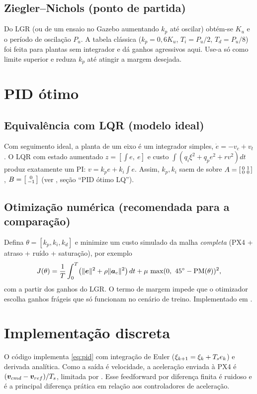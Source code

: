 \subsection{Ziegler--Nichols (ponto de partida)}
Do LGR (ou de um ensaio no Gazebo aumentando $k_p$ até oscilar) obtém-se $K_u$ e o
período de oscilação $P_u$. A tabela clássica ($k_p=0{,}6K_u$, $T_i=P_u/2$,
$T_d=P_u/8$) foi feita para plantas sem integrador e dá ganhos agressivos aqui. Use-a
só como limite superior e reduza $k_p$ até atingir a margem desejada.

\section{PID ótimo}
\subsection{Equivalência com LQR (modelo ideal)}
Com seguimento ideal, a planta de um eixo é um integrador simples, $\dot e = -v_c + v_t$.
O LQR com estado aumentado $z=[\int e,\ e]$ e custo
$\int(q_i\xi^2 + q_p e^2 + r v^2)dt$ produz exatamente um PI:
$v = k_p e + k_i\int e$. Assim, $k_p,k_i$ saem de  sobre
$A=\begin{bsmallmatrix}0&1\\0&0\end{bsmallmatrix}$, $B=\begin{bsmallmatrix}0\\-1\end{bsmallmatrix}$
(ver , seção ``PID ótimo LQ'').

\subsection{Otimização numérica (recomendada para a comparação)}
Defina $\theta=[k_p,k_i,k_d]$ e minimize um custo simulado da malha \emph{completa}
(PX4 + atraso + ruído + saturação), por exemplo
\begin{equation}
  J(\theta) = \frac1{T}\int_0^T\!\left(\lVert\bm{e}\rVert^2 + \rho\lVert\bm{a}_c\rVert^2\right)dt
  + \mu\,\max(0,\ \ang{45}-\text{PM}(\theta))^2 ,
\end{equation}
com  a partir dos ganhos do LGR. O termo de margem impede que o
otimizador escolha ganhos frágeis que só funcionam no cenário de treino.
Implementado em .

\section{Implementação discreta}
O código implementa \eqref{eq:pid} com integração de Euler
($\xi_{k+1}=\xi_k+T_s e_k$) e derivada analítica. Como a saída é velocidade, a
aceleração enviada à PX4 é $(\bm{v}_{cmd}-\bm{v}_{ref})/T_s$, limitada por
. Esse feedforward por diferença finita é ruidoso e é a principal
diferença prática em relação aos controladores de aceleração.
